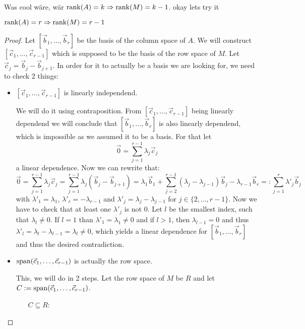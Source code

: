 Was cool wäre, wär $\operatorname{rank}(A) = k \Rightarrow \operatorname{rank}(M) = k - 1$. okay lets try it
\begin{lemma}
    $\operatorname{rank}(A) = r \Rightarrow \operatorname{rank}(M) = r - 1$
\end{lemma}
\begin{proof}
    Let $[\vec b_1, \dots, \vec b_r]$ be the basis of the column space of $A$. We will construct $[\vec c_1, \dots, \vec c_{r-1}]$ which is supposed to be the basis of the row space of $M$. Let $\vec c_j = \vec b_j - \vec b_{j+1}$. In order for it to actually be a basis we are looking for, we need to check 2 things:
    \begin{itemize}
        \item $[\vec c_1, \dots, \vec c_{r-1}]$ is linearly independend.
        
        We will do it using contraposition. From $[\vec c_1, \dots, \vec c_{r-1}]$ being linearly dependend we will conclude that $[\vec b_1, \dots, \vec b_r]$ is also linearly dependend, which is impossible as we assumed it to be a basis. For that let 
        $$\vec 0 = \sum_{j=1}^{r-1} \lambda_j \vec c_j$$
        a linear dependence. Now we can rewrite that:
        $$\vec 0 = \sum_{j=1}^{r-1} \lambda_j \vec c_j = \sum_{j=1}^{r-1} \lambda_j (\vec b_j - \vec b_{j+1}) = \lambda_1 \vec b_1 + \sum_{j=2}^{r-1} (\lambda_j - \lambda_{j-1}) \vec b_j - \lambda_{r-1}\vec b_r =: \sum_{j=1}^{r} \lambda'_j \vec b_j$$
        with $\lambda'_1 = \lambda_1$, $\lambda'_r = -\lambda_{r-1}$ and $\lambda'_j = \lambda_j - \lambda_{j-1}$ for $j \in \{2, \dots, r-1\}$. Now we have to check that at least one $\lambda'_j$ is not 0. Let $l$ be the smallest index, such that $\lambda_l \neq 0$. If $l=1$ than $\lambda'_1 = \lambda_1 \neq 0$ and if $l > 1$, then $\lambda_{l-1} = 0$ and thus $\lambda'_l = \lambda_l - \lambda_{l-1} = \lambda_l \neq 0$, which yields a linear dependence for $[\vec b_1, \dots, \vec b_r]$ and thus the desired contradiction.
        \item $\operatorname{span}(\vec c_1, \dots, \vec c_{r-1})$ is actually the row space. 
        
        This, we will do in 2 steps. Let the row space of $M$ be $R$ and let $C := \operatorname{span}(\vec c_1, \dots, \vec c_{r-1})$.
        \begin{enumerate}
            \item[$C \subseteq R$:]
        \end{enumerate}
    \end{itemize}
\end{proof}

